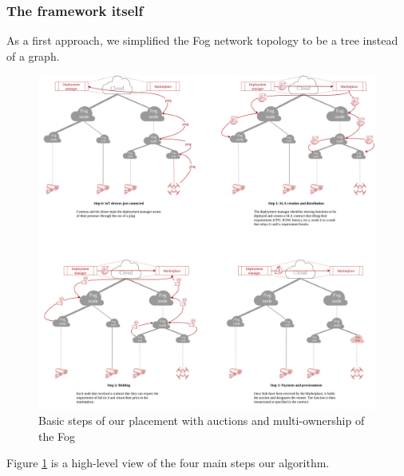 \documentclass[11pt]{sdm}
\begin{document}
\subsubsection{The framework itself}

As a first approach, we simplified the Fog network topology to be a tree instead of a graph. 

\begin{figure}[t]
	\centering
	\includegraphics[width=1\textwidth]{./assets/OurPlacement.drawio.png}
	\caption{Basic steps of our placement with auctions and multi-ownership of the Fog}
	\label{fig:our_placement}
\end{figure}

Figure \ref{fig:our_placement} is a high-level view of the four main steps our algorithm.
\end{document}

